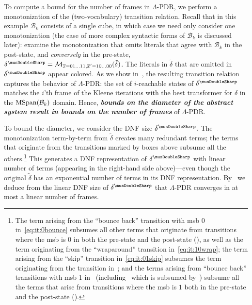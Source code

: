 \documentclass[acmsmall,screen]{acmart}
\newcommand{\ov}{\overline}
\newcommand{\tr}{\delta}
\renewcommand{\vec}{\ov}
\newcommand{\bkwrch}[1]{\mathcal{B}_{#1}}
\newcommand{\monox}[2]{\mathcal{M}_{#2}({#1})}
\newcommand{\mspan}[1]{{\rm MSpan}({#1})}
\newcommand{\bkwspan}[1]{\mspan{\bkwrch{#1}}}
\newcommand{\absr}[1]{{#1}^{\musDoubleSharp}}
\begin{document}
\normalsize
\yotamsmall{omitting: Obviously, the number of terms in $\tilde{\tr}$ is $\Omega\left(2^n\right)$.}
%
%
%
To compute a bound for the number of frames in $\Lambda$-PDR,
%
we perform a monotonization of the (two-vocabulary) transition relation.
Recall that in this example $\bkwrch{k}$ consists of a single cube, in which case we need only consider one monotonization (the case of more complex syntactic forms of $\bkwrch{k}$ is discussed later):
%
%
examine the monotonization that omits literals that agree with $\bkwrch{k}$ in the post-state, and \emph{conversely} in the pre-state,
$\absr{\tr} = \monox{\tilde{\tr}}{\vec{x}=01\ldots11,\vec{x}'=10\ldots00}$. The literals in $\tilde{\tr}$ that are omitted in $\absr{\tr}$ appear colored.
As we show in~, the resulting transition relation captures the behavior of $\Lambda$-PDR:
the set of $i$-reachable states of $\absr{\tr}$
%
%
%
matches the $i$'th frame of the %
Kleene iterations with the best transformer for $\tr$ in the $\bkwspan{k}$ domain.
%
Hence, \textbf{\textit{bounds on the diameter of the abstract system result in bounds on the number of frames}} of $\Lambda$-PDR.
%
%

To bound the diameter, we consider the DNF size $\absr{\tr}$.
The monotonization term-by-term from $\tilde{\tr}$
%
creates many redundant terms; the terms that originate from the transitions marked by boxes above subsume all the others.\footnote{
	The term arising from the ``bounce back'' transition with msb $0$ in~\cref{eq:it:0bounce}
	subsumes all other terms that originate from transitions where the msb is $0$ in both the pre-state and the post-state (), as well as the term originating from the ``wraparound'' transition in~\cref{eq:it:10wrap};
	the term arising from the ``skip'' transition in~\cref{eq:it:01skip} %
	subsumes the term originating from the transition in~;
	and the terms arising from ``bounce back'' transitions with msb $1$ in~ (including~ which is subsumed by~)
	subsume all the terms that arise from transitions where the msb is $1$ both in the pre-state and the post-state (). 	
} %
This generates a DNF representation of $\absr{\tr}$ with linear number of terms (appearing in the right-hand side above)---even though the original $\tilde{\tr}$ has an exponential number of terms in its DNF representation.
%
%
%
%
%
%
%
%
%
%
%
%
By~
%
we deduce from
%
the linear DNF size of $\absr{\tr}$ that
%
$\Lambda$-PDR converges in at most a linear number of frames. %
%
%
%
%
%
%
%
%
%
%
%
%
%
%
\end{document}
